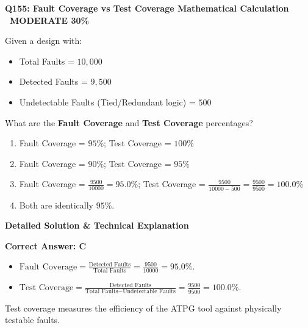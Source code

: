 \documentclass[11pt,a4paper]{article}
\newcommand{\badgemod}{{\color{white}\colorbox{modoran}{\bfseries\sffamily\tiny\ MODERATE 30\%\ }}}
\newenvironment{qbox}[2]{%
  \begin{mdframed}[style=qstyle]%
  {\bfseries\sffamily\color{primaryblue}#1 \hfill #2}\par\vspace{2pt}%
}{%
  \end{mdframed}%
}
\newenvironment{ansbox}{%
  \begin{mdframed}[style=ansstyle]%
  {\bfseries\sffamily\color{ansgreen}\small Detailed Solution \& Technical Explanation}\par\vspace{2pt}\small%
}{%
  \end{mdframed}%
}
\begin{document}
\begin{qbox}{Q155: Fault Coverage vs Test Coverage Mathematical Calculation}{\badgemod}
Given a design with:
\begin{itemize}[leftmargin=1.5em]
  \item Total Faults = $10,000$
  \item Detected Faults = $9,500$
  \item Undetectable Faults (Tied/Redundant logic) = $500$
\end{itemize}
What are the \textbf{Fault Coverage} and \textbf{Test Coverage} percentages?
\begin{enumerate}[label=\textbf{\Alph*.}]
  \item Fault Coverage = $95\%$; Test Coverage = $100\%$
  \item Fault Coverage = $90\%$; Test Coverage = $95\%$
  \item Fault Coverage = $\frac{9500}{10000} = 95.0\%$; Test Coverage = $\frac{9500}{10000 - 500} = \frac{9500}{9500} = 100.0\%$
  \item Both are identically $95\%$.
\end{enumerate}
\end{qbox}
\begin{ansbox}
\textbf{Correct Answer: C}

\begin{itemize}[leftmargin=1.5em]
  \item $\text{Fault Coverage} = \frac{\text{Detected Faults}}{\text{Total Faults}} = \frac{9500}{10000} = 95.0\%$.
  \item $\text{Test Coverage} = \frac{\text{Detected Faults}}{\text{Total Faults} - \text{Undetectable Faults}} = \frac{9500}{9500} = 100.0\%$.
\end{itemize}
Test coverage measures the efficiency of the ATPG tool against physically testable faults.
\end{ansbox}
\end{document}
